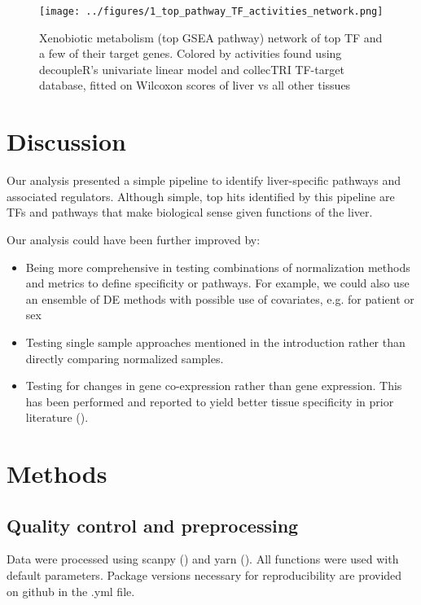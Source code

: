 \documentclass{article}
\begin{document}
\begin{figure}[htbp]
  \centering
  \texttt{[image: ../figures/1\_top\_pathway\_TF\_activities\_network.png]}
  \caption{Xenobiotic metabolism (top GSEA pathway) network of top TF and a few of their target genes. Colored by activities found using decoupleR's univariate linear model and collecTRI TF-target database, fitted on Wilcoxon scores of liver vs all other tissues}
  \label{fig:1_top_pathway_TF_activities_network}
\end{figure}
\FloatBarrier


\section{Discussion}
Our analysis presented a simple pipeline to identify liver-specific pathways and associated regulators. Although simple, top hits identified by this pipeline are TFs and pathways that make biological sense given functions of the liver.

Our analysis could have been further improved by:
\begin{itemize}
  \item Being more comprehensive in testing combinations of normalization methods and metrics to define specificity or pathways. For example, we could also use an ensemble of DE methods with possible use of covariates, e.g. for patient or sex
  \item Testing single sample approaches mentioned in the introduction rather than directly comparing normalized samples. 
  \item Testing for changes in gene co-expression rather than gene expression. This has been performed and reported to yield better tissue specificity in prior literature (\cite{Sonawane2017-gs}).
\end{itemize}

\section{Methods}

\subsection{Quality control and preprocessing}
Data were processed using scanpy (\cite{Wolf2018-tw}) and yarn (\cite{Paulson2017-jv}). All functions were used with default parameters. Package versions necessary for reproducibility are provided on github in the .yml file.
\end{document}
